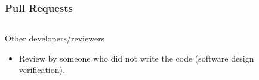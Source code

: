 \documentclass[12pt]{beamer}
\begin{document}
\begin{frame}
\frametitle{Pull Requests}

\begin{columns}
\begin{column}{0.5\textwidth}

Other developers/reviewers
    \begin{itemize}
    \item{Review by someone who did not write the code (\alert{software design verification}).}
    \end{itemize}
\end{column}
\begin{column}{0.5\textwidth}

\end{column}
\end{columns}
\end{frame}
\end{document}
